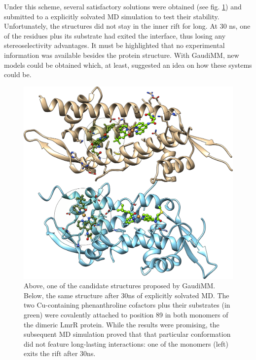 Under this scheme, several satisfactory solutions were obtained (see fig. \ref{fig:phenanthroline}) and submitted to a explicitly solvated MD simulation to test their stability. Unfortunately, the structures did not stay in the inner rift for long. At 30 ns, one of the residues plus its substrate had exited the interface, thus losing any stereoselectivity advantages. It must be highlighted that no experimental information was available besides the protein structure. With GaudiMM, new models could be obtained which, at least, suggested an idea on how these systems could be.

\begin{figure}[hbtp]
	\begin{Center}
		\includegraphics[width=\textwidth]{./figures/06/dual_phn_md.png}
	\end{Center}
	\caption[Proposed Cu-containing phenanthroline containing systems]{Above, one of the candidate structures proposed by GaudiMM. Below, the same structure after 30ns of explicitly solvated MD. The two Cu-containing phenanthroline cofactors plus their substrates (in green) were covalently attached to position 89 in both monomers of the dimeric LmrR protein. While the results were promising, the subsequent MD simulation proved that that particular conformation did not feature long-lasting interactions: one of the monomers (left) exits the rift after 30ns.}
	\label{fig:phenanthroline}
\end{figure}

